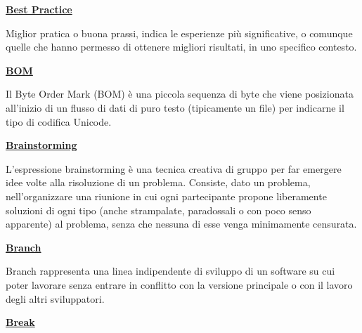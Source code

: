 \vspace*{2\bigskipamount}


\begin{addmargin}[0em]{0em}
	\textbf{\underline{Best Practice}} 
\end{addmargin}
	
\medskip
\begin{addmargin}[5em]{1em}
Miglior pratica o buona prassi, indica le esperienze più significative, o comunque quelle che hanno permesso di ottenere migliori risultati, in uno specifico contesto.
\end{addmargin}

\bigskip
\begin{addmargin}[0em]{0em}
	\textbf{\underline{BOM}} 
\end{addmargin}
	
\medskip
\begin{addmargin}[5em]{1em}
Il Byte Order Mark (BOM) è una piccola sequenza di byte che viene posizionata
all’inizio di un flusso di dati di puro testo (tipicamente un file) per indicarne il
tipo di codifica Unicode.
\end{addmargin}

\bigskip
\begin{addmargin}[0em]{0em}	
	\textbf{\underline{Brainstorming}}
\end{addmargin}
	
\medskip
\begin{addmargin}[5em]{1em}	
L'espressione brainstorming è una tecnica creativa di gruppo per far emergere idee volte alla risoluzione di un problema. Consiste, dato un problema, nell'organizzare una riunione in cui ogni partecipante propone liberamente soluzioni di ogni tipo (anche strampalate, paradossali o con poco senso apparente) al problema, senza che nessuna di esse venga minimamente censurata.
\end{addmargin}

\bigskip
\begin{addmargin}[0em]{0em}
	\textbf{\underline{Branch}} 
\end{addmargin}
	
\medskip
\begin{addmargin}[5em]{1em}
Branch rappresenta una linea indipendente di sviluppo di un software su cui poter lavorare 
senza entrare in conflitto con la versione principale o con il lavoro degli altri sviluppatori.
\end{addmargin}

\bigskip
\begin{addmargin}[0em]{0em}	
	\textbf{\underline{Break}}
\end{addmargin}
	
